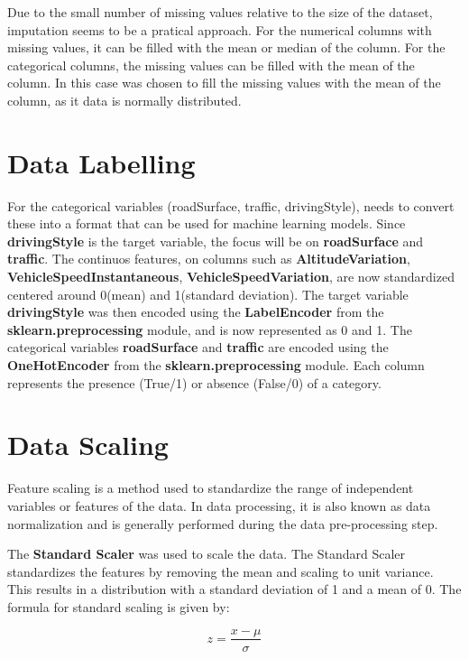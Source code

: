 Due to the small number of missing values relative to the size of the dataset, imputation seems to be a pratical approach. For the numerical columns with missing values, it can be filled
with the mean or median of the column. For the categorical columns, the missing values can be filled with the mean of the column.
In this case was chosen to fill the missing values with the mean of the column, as it data is normally distributed.

\section{Data Labelling}

For the categorical variables (roadSurface, traffic, drivingStyle), needs to convert these into a format that can be used for machine learning models. 
Since \textbf{drivingStyle} is the target variable, the focus will be on \textbf{roadSurface} and \textbf{traffic}. The continuos features, on columns such as \textbf{AltitudeVariation}, 
\textbf{VehicleSpeedInstantaneous}, \textbf{VehicleSpeedVariation}, are now standardized centered around 0(mean) and 1(standard deviation). 
The target variable \textbf{drivingStyle} was then encoded using the \textbf{LabelEncoder} from the \textbf{sklearn.preprocessing} module, and is now represented as 0 and 1.
The categorical variables \textbf{roadSurface} and \textbf{traffic} are encoded using the \textbf{OneHotEncoder} from the \textbf{sklearn.preprocessing} module. Each column represents
the presence (True/1) or absence (False/0) of a category.

\section{Data Scaling}

Feature scaling is a method used to standardize the range of independent variables or features of the data. In data processing, it is also known as data 
normalization and is generally performed during the data pre-processing step.

The \textbf{Standard Scaler} was used to scale the data. The Standard Scaler standardizes the features by removing the mean and scaling to unit variance.
This results in a distribution with a standard deviation of 1 and a mean of 0. The formula for standard scaling is given by:

\begin{equation}
    z = \frac{x - \mu}{\sigma}
\end{equation}

